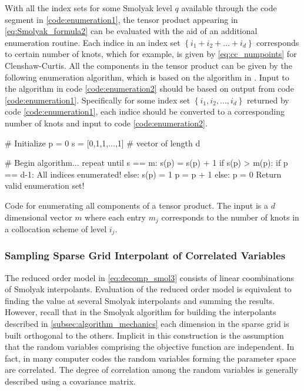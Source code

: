 With all the index sets for some Smolyak level $q$ available through the code segment in \ref{code:enumeration1}, the tensor product appearing in \ref{eq:Smolyak_formula2} can be evaluated with the aid of an additional enumeration routine. Each indice in an index set $\left\{i_1+i_2+...+i_d\right\}$ corresponds to certain number of knots, which for example, is given by \ref{eq:cc_numpoints} for Clenshaw-Curtis. All the components in the tensor product can be given by the following enumeration algorithm, which is based on the algorithm in \cite{Holtz}. Input to the algorithm in code \ref{code:enumeration2} should be based on output from code \ref{code:enumeration1}. Specifically for some index set $\left\{i_1,i_2,...,i_d\right\}$ returned by code \ref{code:enumeration1}, each indice should be converted to a corresponding number of knots and input to code \ref{code:enumeration2}.     
\begin{program} 
\begin{code}
   # Initialize
   p = 0
   s = [0,1,1,...,1]  # vector of length d 

   # Begin algorithm...
   repeat until s == m: 
      s(p) = s(p) + 1
      if s(p) > m(p):
         if p == d-1:
            All indices enumerated!
         else:
            s(p) = 1
            p = p + 1
      else:
         p = 0
         Return valid enumeration set!
\end{code}
\caption{\label{code:enumeration2} 
Code for enumerating all components of a tensor product. The input is a $d$ dimensional vector $m$ where each entry $m_j$ corresponds to the number of knots in a collocation scheme of level $i_j$.}  
\end{program}

\subsubsection{Sampling Sparse Grid Interpolant of Correlated Variables} \label{subsubsec:sampling_smolyak}

The reduced order model in \ref{eq:decomp_smol3} consists of linear coombinations of Smolyak interpolants. Evaluation of the reduced order model is equivalent to finding the value at several Smolyak interpolants and summing the results. However, recall that in the Smolyak algorithm for building the interpolants described in \ref{subsec:algorithm_mechanics} each dimension in the sparse grid is built orthogonal to the others. Implicit in this construction is the assumption that the random variables comprising the objective function are independent. In fact, in many computer codes the random variables forming the parameter space are correlated. The degree of correlation among the random variables is generally described using a covariance matrix. 

